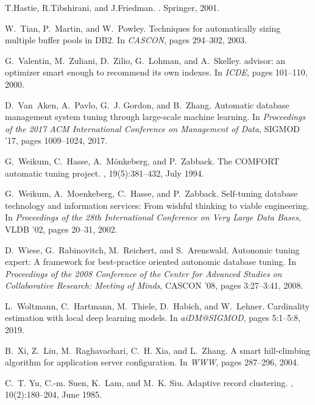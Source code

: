 \documentclass[11pt,times]{article}
\begin{document}
\begin{thebibliography}{10}
T.Hastie, R.Tibshirani, and J.Friedman.
.
\newblock Springer, 2001.

W.~Tian, P.~Martin, and W.~Powley.
\newblock Techniques for automatically sizing multiple buffer pools in {DB2}.
\newblock In {\em CASCON}, pages 294--302, 2003.

G.~Valentin, M.~Zuliani, D.~Zilio, G.~Lohman, and A.~Skelley.
 advisor: an optimizer smart enough to recommend its own
  indexes.
\newblock In {\em ICDE}, pages 101--110, 2000.

D.~Van~Aken, A.~Pavlo, G.~J. Gordon, and B.~Zhang.
\newblock Automatic database management system tuning through large-scale
  machine learning.
\newblock In {\em Proceedings of the 2017 ACM International Conference on
  Management of Data}, SIGMOD '17, pages 1009--1024, 2017.

G.~Weikum, C.~Hasse, A.~M\"{o}nkeberg, and P.~Zabback.
\newblock The {COMFORT} automatic tuning project.
, 19(5):381--432, July 1994.

G.~Weikum, A.~Moenkeberg, C.~Hasse, and P.~Zabback.
\newblock Self-tuning database technology and information services: From
  wishful thinking to viable engineering.
\newblock In {\em Proceedings of the 28th International Conference on Very
  Large Data Bases}, VLDB '02, pages 20--31, 2002.

D.~Wiese, G.~Rabinovitch, M.~Reichert, and S.~Arenswald.
\newblock Autonomic tuning expert: A framework for best-practice oriented
  autonomic database tuning.
\newblock In {\em Proceedings of the 2008 Conference of the Center for Advanced
  Studies on Collaborative Research: Meeting of Minds}, CASCON '08, pages
  3:27--3:41, 2008.

L.~Woltmann, C.~Hartmann, M.~Thiele, D.~Habich, and W.~Lehner.
\newblock Cardinality estimation with local deep learning models.
\newblock In {\em aiDM@SIGMOD}, pages 5:1--5:8, 2019.

B.~Xi, Z.~Liu, M.~Raghavachari, C.~H. Xia, and L.~Zhang.
\newblock A smart hill-climbing algorithm for application server configuration.
\newblock In {\em WWW}, pages 287--296, 2004.

C.~T. Yu, C.-m. Suen, K.~Lam, and M.~K. Siu.
\newblock Adaptive record clustering.
, 10(2):180--204, June 1985.


\end{thebibliography}
\end{document}

